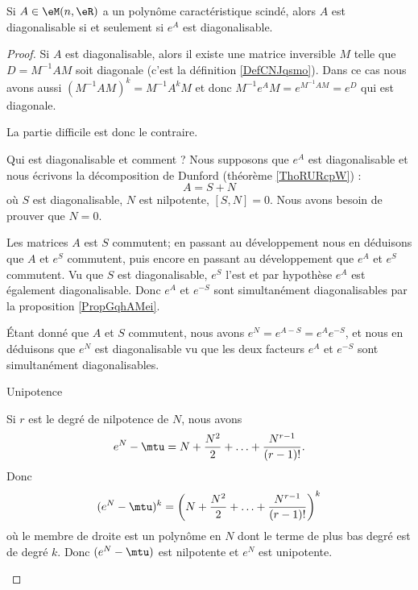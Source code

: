 \begin{proposition}      \label{PropCOMNooIErskN}
    Si \( A\in \eM(n,\eR)\) a un polynôme caractéristique scindé, alors \( A\) est diagonalisable si et seulement si \( e^A\) est diagonalisable.
\end{proposition}

\begin{proof}
    Si \( A\) est diagonalisable, alors il existe une matrice inversible \( M\) telle que \( D=M^{-1}AM\) soit diagonale (c'est la définition \ref{DefCNJqsmo}). Dans ce cas nous avons aussi \( (M^{-1}AM)^k=M^{-1}A^kM\) et donc \( M^{-1}e^AM=e^{M^{-1}AM}=e^D\) qui est diagonale.

    La partie difficile est donc le contraire. 
    
    \begin{subproof}
        \item[Qui est diagonalisable et comment ?]
            Nous supposons que \( e^A\) est diagonalisable et nous écrivons la décomposition de Dunford (théorème \ref{ThoRURcpW}) :
            \begin{equation}
                A=S+N
            \end{equation}
            où \( S\) est diagonalisable, \( N\) est nilpotente, \( [S,N]=0\). Nous avons besoin de prouver que \( N=0\).
    
            Les matrices \( A\) est \( S\) commutent; en passant au développement nous en déduisons que \( A\) et \( e^S\) commutent, puis encore en passant au développement que \( e^A\) et \( e^S\) commutent. Vu que \( S\) est diagonalisable, \( e^S\) l'est et par hypothèse \( e^A\) est également diagonalisable. Donc \( e^A\) et \( e^{-S}\) sont simultanément diagonalisables par la proposition \ref{PropGqhAMei}.

            Étant donné que \( A\) et \( S\) commutent, nous avons \( e^N=e^{A-S}=e^Ae^{-S}\), et nous en déduisons que \( e^N\) est diagonalisable vu que les deux facteurs \( e^A\) et \( e^{-S}\) sont simultanément diagonalisables.

        \item[Unipotence]

            Si \( r\) est le degré de nilpotence de \( N\), nous avons
            \begin{equation}    \label{EqQHjvLZQ}
                e^N-\mtu=N+\frac{ N^2 }{2}+\ldots +\frac{ N^{r-1} }{ (r-1)! }.
            \end{equation}
            Donc
            \begin{equation}
                (e^N-\mtu)^k=\left( N+\frac{ N^2 }{2}+\ldots +\frac{ N^{r-1} }{ (r-1)! } \right)^k
            \end{equation}
            où le membre de droite est un polynôme en \( N\) dont le terme de plus bas degré est de degré \( k\). Donc \( (e^N-\mtu)\) est nilpotente et \( e^N\) est unipotente.


\end{subproof}
\end{proof}
